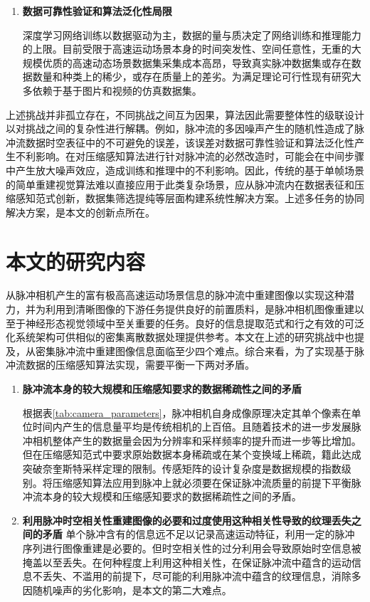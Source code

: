 \begin{enumerate}
  \item \textbf{数据可靠性验证和算法泛化性局限}

        深度学习网络训练以数据驱动为主，数据的量与质决定了网络训练和推理能力的上限。目前受限于高速运动场景本身的时间突发性、空间任意性，无重的大规模优质的高速动态场景数据集采集成本高昂，导致真实脉冲数据集或存在数据数量和种类上的稀少，或存在质量上的差劣。为满足理论可行性现有研究大多依赖于基于图片和视频的仿真数据集\cite{SpikingSIM}。
\end{enumerate}

上述挑战并非孤立存在，不同挑战之间互为因果，算法因此需要整体性的级联设计以对挑战之间的复杂性进行解耦。例如，脉冲流的多因噪声产生的随机性造成了脉冲流数据时空表征中的不可避免的误差，该误差对数据可靠性验证和算法泛化性产生不利影响。在对压缩感知算法进行针对脉冲流的必然改造时，可能会在中间步骤中产生放大噪声效应，造成训练和推理中的不利影响。因此，传统的基于单帧场景的简单重建视觉算法难以直接应用于此类复杂场景，应从脉冲流内在数据表征和压缩感知范式创新，数据集筛选提纯等层面构建系统性解决方案。上述多任务的协同解决方案，是本文的创新点所在。

\section{本文的研究内容}

从脉冲相机产生的富有极高高速运动场景信息的脉冲流中重建图像以实现这种潜力，并为利用到清晰图像的下游任务提供良好的前置质料，是脉冲相机图像重建以至于神经形态视觉领域中至关重要的任务。良好的信息提取范式和行之有效的可泛化系统架构可供相似的密集离散数据处理提供参考。本文在上述的研究挑战中也提及，从密集脉冲流中重建图像信息面临至少四个难点。综合来看，为了实现基于脉冲流数据的压缩感知算法实现，需要平衡一下两对矛盾。
\begin{enumerate}
  \item \textbf{脉冲流本身的较大规模和压缩感知要求的数据稀疏性之间的矛盾}

        根据表\ref{tab:camera_parameters}，脉冲相机自身成像原理决定其单个像素在单位时间内产生的信息量平均是传统相机的上百倍。且随着技术的进一步发展脉冲相机整体产生的数据量会因为分辨率和采样频率的提升而进一步等比增加。但在压缩感知范式中要求原始数据本身稀疏或在某个变换域上稀疏，籍此达成突破奈奎斯特采样定理的限制。传感矩阵的设计复杂度是数据规模的指数级别。将压缩感知算法应用到脉冲上就必须要在保证脉冲流质量的前提下平衡脉冲流本身的较大规模和压缩感知要求的数据稀疏性之间的矛盾。

  \item \textbf{利用脉冲时空相关性重建图像的必要和过度使用这种相关性导致的纹理丢失之间的矛盾}
        单个脉冲含有的信息远不足以记录高速运动特征，利用一定的脉冲序列进行图像重建是必要的。但时空相关性的过分利用会导致原始时空信息被掩盖以至丢失。在何种程度上利用这种相关性，在保证脉冲流中蕴含的运动信息不丢失、不滥用的前提下，尽可能的利用脉冲流中蕴含的纹理信息，消除多因随机噪声的劣化影响，是本文的第二大难点。

\end{enumerate}

